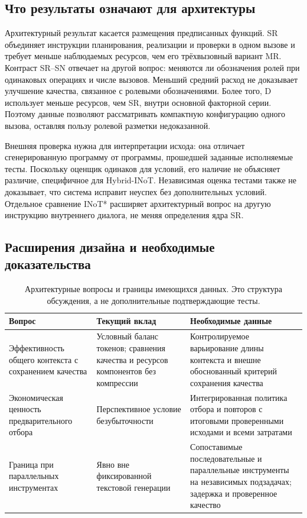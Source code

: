\subsection{Что результаты означают для архитектуры}
Архитектурный результат касается размещения предписанных функций. SR объединяет инструкции планирования, реализации и проверки в одном вызове и требует меньше наблюдаемых ресурсов, чем его трёхвызовный вариант MR. Контраст SR--SN отвечает на другой вопрос: меняются ли обозначения ролей при одинаковых операциях и числе вызовов. Меньший средний расход не доказывает улучшение качества, связанное с ролевыми обозначениями. Более того, D использует меньше ресурсов, чем SR, внутри основной факторной серии. Поэтому данные позволяют рассматривать компактную конфигурацию одного вызова, оставляя пользу ролевой разметки недоказанной.

Внешняя проверка нужна для интерпретации исхода: она отличает сгенерированную программу от программы, прошедшей заданные исполняемые тесты. Поскольку оценщик одинаков для условий, его наличие не объясняет различие, специфичное для Hybrid-INoT. Независимая оценка тестами также не доказывает, что система исправит неуспех без дополнительных условий. Отдельное сравнение INoT* расширяет архитектурный вопрос на другую инструкцию внутреннего диалога, не меняя определения ядра SR.

\subsection{Расширения дизайна и необходимые доказательства}
\begin{table}[htbp]\centering\small
\caption{Архитектурные вопросы и границы имеющихся данных. Это структура обсуждения, а не дополнительные подтверждающие тесты.}
\label{tab:hybrid-scope}
\begin{tabularx}{\textwidth}{@{}>{\raggedright\arraybackslash}p{}>{\raggedright\arraybackslash}X>{\raggedright\arraybackslash}X@{}}\toprule
Вопрос & Текущий вклад & Необходимые данные\\\midrule
Эффективность общего контекста с сохранением качества & Условный баланс токенов; сравнения качества и ресурсов компонентов без компрессии & Контролируемое варьирование длины контекста и внешне обоснованный критерий сохранения качества\\
Экономическая ценность предварительного отбора & Перспективное условие безубыточности & Интегрированная политика отбора и повторов с итоговыми проверенными исходами и всеми затратами\\
Граница при параллельных инструментах & Явно вне фиксированной текстовой генерации & Сопоставимые последовательные и параллельные инструменты на независимых подзадачах; задержка и проверенное качество\\\bottomrule
\end{tabularx}\end{table}

